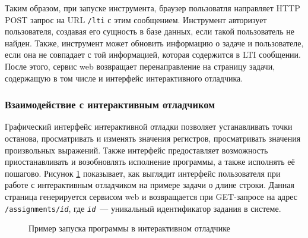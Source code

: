 \documentclass[a4paper,article,14pt]{extarticle}
\begin{document}
Таким образом, при запуске инструмента, браузер пользоватля направляет HTTP POST запрос на URL \texttt{/lti} с этим сообщением. Инструмент авторизует пользователя, создавая его сущность в базе данных, если такой пользователь не найден. Также, инструмент может обновить информацию о задаче и пользователе, если она не совпадает с той информацией, которая содержится в LTI сообщении. После этого, сервис web возвращает перенаправление на страницу задачи, содержащую в том числе и интерфейс интерактивного отладчика.

\subsubsection{Взаимодействие с интерактивным отладчиком}

Графический интерфейс интерактивной отладки позволяет устанавливать точки останова, просматривать и изменять значения регистров, просматривать значения произвольных выражений. Также интерфейс предоставляет возможность приостанавливать и возобновлять исполнение программы, а также исполнять её пошагово. Рисунок \ref{fig:strlen} показывает, как выглядит интерфейс пользователя при работе с интерактивным отладчиком на примере задачи о длине строки. Данная страница генерируется сервисом web и возвращается при GET-запросе на адрес \texttt{/assignments/\textit{id}}, где \texttt{\textit{id}}~--- уникальный идентификатор задания в системе.

\begin{figure}[h]
    \begin{center}
        \caption{\label{fig:strlen} Пример запуска программы в интерактивном отладчике}
    \end{center}
\end{figure}
\end{document}
